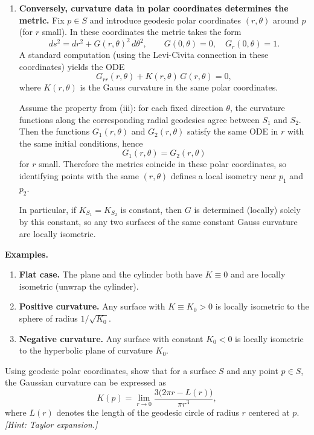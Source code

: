 \begin{solution}
\begin{enumerate}
		\item \textbf{Conversely, curvature data in polar coordinates determines the metric.}
		Fix $p\in S$ and introduce geodesic polar coordinates $(r,\theta)$ around $p$ (for $r$ small).
		In these coordinates the metric takes the form
		\[
		ds^2 = dr^2 + G(r,\theta)^2\,d\theta^2,
		\qquad
		G(0,\theta)=0,\quad G_r(0,\theta)=1.
		\]
		A standard computation (using the Levi-Civita connection in these coordinates) yields the ODE
		\[
		G_{rr}(r,\theta)+K(r,\theta)\,G(r,\theta)=0,
		\]
		where $K(r,\theta)$ is the Gauss curvature in the same polar coordinates.
		
		Assume the property from (iii): for each fixed direction $\theta$, the curvature functions along the corresponding radial
		geodesics agree between $S_1$ and $S_2$. Then the functions $G_1(r,\theta)$ and $G_2(r,\theta)$ satisfy the same ODE in $r$
		with the same initial conditions, hence
		\[
		G_1(r,\theta)=G_2(r,\theta)
		\]
		for $r$ small. Therefore the metrics coincide in these polar coordinates, so identifying points with the same $(r,\theta)$
		defines a local isometry near $p_1$ and $p_2$.
		
		In particular, if $K_{S_1}=K_{S_2}$ is constant, then $G$ is determined (locally) solely by this constant, so any two
		surfaces of the same constant Gauss curvature are locally isometric.
	\end{enumerate}
	
	\medskip
	\textbf{Examples.}
	\begin{enumerate}
		\item \textbf{Flat case.} The plane and the cylinder both have $K\equiv 0$ and are locally isometric (unwrap the cylinder).
		\item \textbf{Positive curvature.} Any surface with $K\equiv K_0>0$ is locally isometric to the sphere of radius
		$1/\sqrt{K_0}$.
		\item \textbf{Negative curvature.} Any surface with constant $K_0<0$ is locally isometric to the hyperbolic plane of
		curvature $K_0$.
	\end{enumerate}
\end{solution}

\begin{problem}
\label{prob:cp-vii-0075}
Using geodesic polar coordinates, show that for a surface \(S\) and any point \(p\in S\), the Gaussian curvature can be expressed as
\[
K(p)=\lim_{r\to 0}\frac{3\bigl(2\pi r-L(r)\bigr)}{\pi r^{3}},
\]
where \(L(r)\) denotes the length of the geodesic circle of radius \(r\) centered at \(p\).
\emph{[Hint: Taylor expansion.]}
\end{problem}

